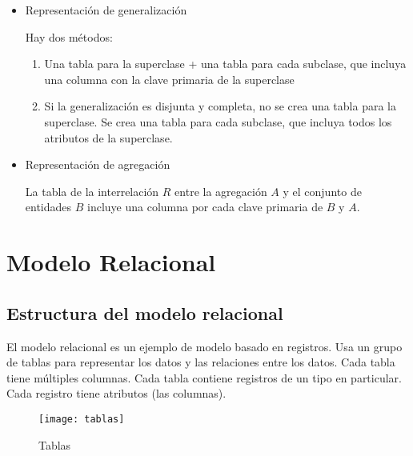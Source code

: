\documentclass[a4paper, twoside]{article}
\begin{document}
\begin{itemize}
	\item Representación de generalización

	Hay dos métodos:
	\begin{enumerate}
		\item Una tabla para la superclase + una tabla para cada subclase, que incluya una columna con la clave primaria de la superclase
		\item Si la generalización es disjunta y completa, no se crea una tabla para la superclase. Se crea una tabla para cada subclase, que incluya todos los atributos de la superclase.
	\end{enumerate}

	\item Representación de agregación

	La tabla de la interrelación $R$ entre la agregación $A$ y el conjunto de entidades $B$ incluye una columna por cada clave primaria de $B$ y $A$.
\end{itemize}

\section{Modelo Relacional}
\subsection{Estructura del modelo relacional}
El modelo relacional es un ejemplo de modelo basado en registros. Usa un grupo de tablas para representar los datos y las relaciones entre los datos. Cada tabla tiene múltiples columnas. Cada tabla contiene registros de un tipo en particular. Cada registro tiene atributos (las columnas).

\begin{figure}[H]
	\centering
	\texttt{[image: tablas]}
	\caption{Tablas}
\end{figure}
\end{document}
